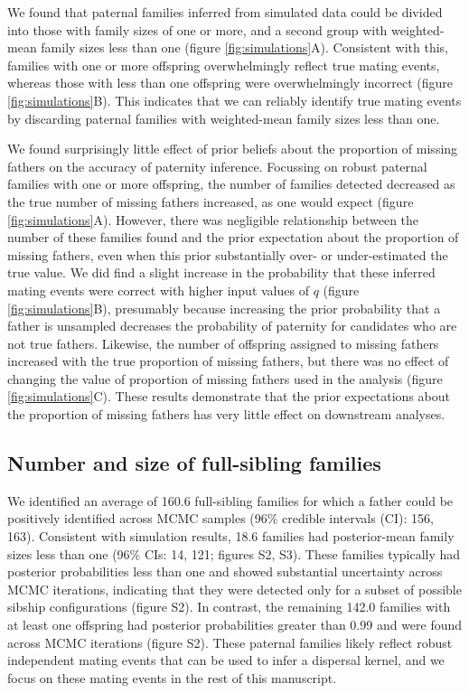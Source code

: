 \documentclass[10pt, a4paper, twocolumn]{article} %
\begin{document}
We found that paternal families inferred from simulated data could be divided into those with family sizes of one or more, and a second group with weighted-mean family sizes less than one (figure \ref{fig:simulations}A).
Consistent with this, families with one or more offspring overwhelmingly reflect true mating events, whereas those with less than one offspring were overwhelmingly incorrect (figure \ref{fig:simulations}B).
This indicates that we can reliably identify true mating events by discarding paternal families with weighted-mean family sizes less than one.

We found surprisingly little effect of prior beliefs about the proportion of missing fathers on the accuracy of paternity inference.
Focussing on robust paternal families with one or more offspring, the number of families detected decreased as the true number of missing fathers increased, as one would expect (figure \ref{fig:simulations}A).
However, there was negligible relationship between the number of these families found and the prior expectation about the proportion of missing fathers, even when this prior substantially over- or under-estimated the true value.
We did find a slight increase in the probability that these inferred mating events were correct with higher input values of $q$ (figure \ref{fig:simulations}B), presumably because increasing the prior probability that a father is unsampled decreases the probability of paternity for candidates who are not true fathers.
Likewise, the number of offspring assigned to missing fathers increased with the true proportion of missing fathers, but there was no effect of changing the value of proportion of missing fathers used in the analysis (figure \ref{fig:simulations}C).
These results demonstrate that the prior expectations about the proportion of missing fathers has very little effect on downstream analyses.

\subsection{Number and size of full-sibling families}

We identified an average of 160.6 full-sibling families for which a father could be positively identified across MCMC samples (96\% credible intervals (CI): 156, 163).
Consistent with simulation results, 18.6 families had posterior-mean family sizes less than one (96\% CIs: 14, 121; figures S2, S3).
These families typically had posterior probabilities less than one and showed substantial uncertainty across MCMC iterations, indicating that they were detected only for a subset of possible sibship configurations (figure S2).
In contrast, the remaining 142.0 families with at least one offspring had posterior probabilities greater than 0.99 and were found across MCMC iterations (figure S2).
These paternal families likely reflect robust independent mating events that can be used to infer a dispersal kernel, and we focus on these mating events in the rest of this manuscript.
\end{document}
